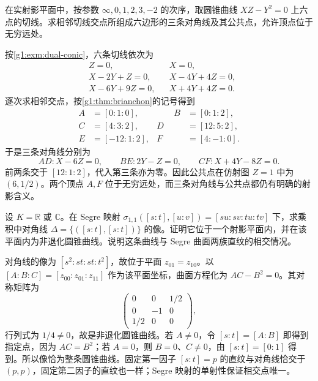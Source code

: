 \begin{exercise}\label{g1:ex:brianchon-computation}
	在实射影平面中，按参数 \(\infty,0,1,2,3,-2\) 的次序，取圆锥曲线 \(XZ-Y^2=0\) 上六点的切线。求相邻切线交点所组成六边形的三条对角线及其公共点，允许顶点位于无穷远处。
\end{exercise}
\begin{solution}
	按\cref{g1:exm:dual-conic}，六条切线依次为
	\[
		\begin{aligned}
			&Z=0,&&X=0,\\
			&X-2Y+Z=0,&&X-4Y+4Z=0,\\
			&X-6Y+9Z=0,&&X+4Y+4Z=0.
		\end{aligned}
	\]
	逐次求相邻交点，按\cref{g1:thm:brianchon}的记号得到
	\[
		\begin{aligned}
			A&=[0:1:0],&\qquad B&=[0:1:2],\\
			C&=[4:3:2],& D&=[12:5:2],\\
			E&=[-12:1:2],& F&=[4:-1:0].
		\end{aligned}
	\]
	于是三条对角线分别为
	\[
		AD:X-6Z=0,\qquad BE:2Y-Z=0,\qquad CF:X+4Y-8Z=0.
	\]
	前两条交于 \([12:1:2]\)，代入第三条亦为零。因此公共点在仿射图 \(Z=1\) 中为 \((6,1/2)\)。两个顶点 \(A,F\) 位于无穷远处，而三条对角线与公共点都仍有明确的射影含义。
\end{solution}

\begin{exercise}\label{g1:ex:segre-diagonal}
	设 \(K=\mathbb R\) 或 \(\mathbb C\)。在 Segre 映射 \(\sigma_{1,1}([s:t],[u:v])=[su:sv:tu:tv]\) 下，求乘积中对角线 \(\Delta=\{([s:t],[s:t])\}\) 的像。证明它位于一个射影平面内，并在该平面内为非退化圆锥曲线。说明这条曲线与 Segre 曲面两族直纹的相交情况。
\end{exercise}
\begin{solution}
	对角线的像为 \([s^2:st:st:t^2]\)，故位于平面 \(z_{01}=z_{10}\)。以 \([A:B:C]=[z_{00}:z_{01}:z_{11}]\) 作为该平面坐标，曲面方程化为 \(AC-B^2=0\)。其对称矩阵为
	\[
		\begin{pmatrix}0&0&1/2\\0&-1&0\\1/2&0&0\end{pmatrix},
	\]
	行列式为 \(1/4\ne0\)，故是非退化圆锥曲线。若 \(A\ne0\)，令 \([s:t]=[A:B]\) 即得到指定点，因为 \(AC=B^2\)；若 \(A=0\)，则 \(B=0\)、\(C\ne0\)，由 \([s:t]=[0:1]\) 得到。所以像恰为整条圆锥曲线。固定第一因子 \([s:t]=p\) 的直纹与对角线恰交于 \((p,p)\)，固定第二因子的直纹也一样；Segre 映射的单射性保证相交点唯一。
\end{solution}

